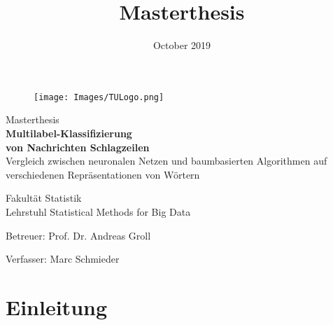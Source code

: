 \documentclass[a4paper,11pt]{article}
\begin{document}
\begin{titlepage}

\vspace*{3cm}


\begin{figure}[t]
\begin{flushright}
\texttt{[image: Images/TULogo.png]}
\label{fig2}

\end{flushright}
\end{figure}
\vspace*{3cm}


\begin{center}

\vspace*{2cm}

\title{Masterthesis}



{\huge Masterthesis}\\
 {\huge{\textbf{Multilabel-Klassifizierung \\
 von Nachrichten Schlagzeilen}}\\}
 \vspace{0.2cm}
 {\large  Vergleich zwischen neuronalen Netzen und baumbasierten Algorithmen auf verschiedenen Repräsentationen von Wörtern\\}
\vspace*{5cm}


{\large  Fakultät Statistik\\
Lehrstuhl Statistical Methods for Big Data }
\vspace*{0.5cm}

 \begin{large}
 Betreuer: Prof. Dr. Andreas Groll\\
  \end{large}

  \begin{large}
Verfasser: Marc Schmieder\\
\date{October 2019}
   \vspace*{2cm}

 \end{large}
\end{center}
\newpage
\thispagestyle{empty}
\tableofcontents
\newpage
\end{titlepage}







\section{Einleitung}
\end{document}
